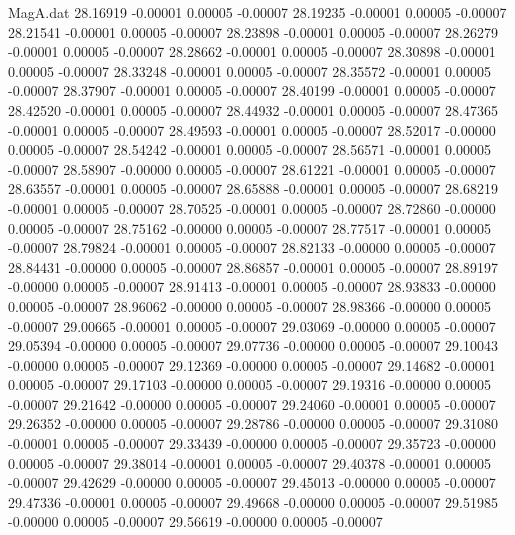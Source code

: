 \begin{filecontents}{MagA.dat}
  28.16919   -0.00001    0.00005   -0.00007
  28.19235   -0.00001    0.00005   -0.00007
  28.21541   -0.00001    0.00005   -0.00007
  28.23898   -0.00001    0.00005   -0.00007
  28.26279   -0.00001    0.00005   -0.00007
  28.28662   -0.00001    0.00005   -0.00007
  28.30898   -0.00001    0.00005   -0.00007
  28.33248   -0.00001    0.00005   -0.00007
  28.35572   -0.00001    0.00005   -0.00007
  28.37907   -0.00001    0.00005   -0.00007
  28.40199   -0.00001    0.00005   -0.00007
  28.42520   -0.00001    0.00005   -0.00007
  28.44932   -0.00001    0.00005   -0.00007
  28.47365   -0.00001    0.00005   -0.00007
  28.49593   -0.00001    0.00005   -0.00007
  28.52017   -0.00000    0.00005   -0.00007
  28.54242   -0.00001    0.00005   -0.00007
  28.56571   -0.00001    0.00005   -0.00007
  28.58907   -0.00000    0.00005   -0.00007
  28.61221   -0.00001    0.00005   -0.00007
  28.63557   -0.00001    0.00005   -0.00007
  28.65888   -0.00001    0.00005   -0.00007
  28.68219   -0.00001    0.00005   -0.00007
  28.70525   -0.00001    0.00005   -0.00007
  28.72860   -0.00000    0.00005   -0.00007
  28.75162   -0.00000    0.00005   -0.00007
  28.77517   -0.00001    0.00005   -0.00007
  28.79824   -0.00001    0.00005   -0.00007
  28.82133   -0.00000    0.00005   -0.00007
  28.84431   -0.00000    0.00005   -0.00007
  28.86857   -0.00001    0.00005   -0.00007
  28.89197   -0.00000    0.00005   -0.00007
  28.91413   -0.00001    0.00005   -0.00007
  28.93833   -0.00000    0.00005   -0.00007
  28.96062   -0.00000    0.00005   -0.00007
  28.98366   -0.00000    0.00005   -0.00007
  29.00665   -0.00001    0.00005   -0.00007
  29.03069   -0.00000    0.00005   -0.00007
  29.05394   -0.00000    0.00005   -0.00007
  29.07736   -0.00000    0.00005   -0.00007
  29.10043   -0.00000    0.00005   -0.00007
  29.12369   -0.00000    0.00005   -0.00007
  29.14682   -0.00001    0.00005   -0.00007
  29.17103   -0.00000    0.00005   -0.00007
  29.19316   -0.00000    0.00005   -0.00007
  29.21642   -0.00000    0.00005   -0.00007
  29.24060   -0.00001    0.00005   -0.00007
  29.26352   -0.00000    0.00005   -0.00007
  29.28786   -0.00000    0.00005   -0.00007
  29.31080   -0.00001    0.00005   -0.00007
  29.33439   -0.00000    0.00005   -0.00007
  29.35723   -0.00000    0.00005   -0.00007
  29.38014   -0.00001    0.00005   -0.00007
  29.40378   -0.00001    0.00005   -0.00007
  29.42629   -0.00000    0.00005   -0.00007
  29.45013   -0.00000    0.00005   -0.00007
  29.47336   -0.00001    0.00005   -0.00007
  29.49668   -0.00000    0.00005   -0.00007
  29.51985   -0.00000    0.00005   -0.00007
  29.56619   -0.00000    0.00005   -0.00007

\end{filecontents}
